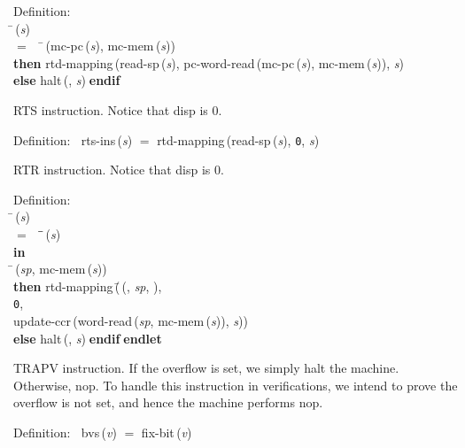 \begin{tabbing}{\sc Definition}: \\  
\=\,({\it{s\/}}) \\ 
$=$$\;\;\;\;$\=\,({\rm{mc-pc}}\,({\it{s\/}}), {\rm{mc-mem}}\,({\it{s\/}})) \\ 
{\bf then }{\rm{rtd-mapping}}\,({\rm{read-sp}}\,({\it{s\/}}), {\rm{pc-word-read}}\,({\rm{mc-pc}}\,({\it{s\/}}), {\rm{mc-mem}}\,({\it{s\/}})), {\it{s\/}}) \\ 
{\bf else }{\rm{halt}}\,({}, {\it{s\/}})$\;${\bf  endif}\-\-
\end{tabbing}

 RTS instruction.
 Notice that disp is 0.
\begin{tabbing}{\sc Definition}:$\;\;$
{\rm{rts-ins}}\,({\it{s\/}}) $=$ {\rm{rtd-mapping}}\,({\rm{read-sp}}\,({\it{s\/}}), {\tt{0}}, {\it{s\/}})
\end{tabbing}

 RTR instruction.
 Notice that disp is 0.
\begin{tabbing}{\sc Definition}: \\  
\=\,({\it{s\/}}) \\ 
$=$$\;\;\;\;$\=\=\,({\it{s\/}})\- \\ 
{\bf in} \\ 
\=\,({\it{sp\/}}, {\rm{mc-mem}}\,({\it{s\/}})) \\ 
{\bf then }{\rm{rtd-mapping}}\,(\=\,({}, {\it{sp\/}}, {}), \\ 
{\tt{0}}, \\ 
{\rm{update-ccr}}\,({\rm{word-read}}\,({\it{sp\/}}, {\rm{mc-mem}}\,({\it{s\/}})), {\it{s\/}}))\- \\ 
{\bf else }{\rm{halt}}\,({}, {\it{s\/}})$\;${\bf  endif}\-$\;${\bf  endlet}\-\-
\end{tabbing}

 TRAPV instruction.
 If the overflow is set, we simply halt the machine.  Otherwise, nop.
 To handle this instruction in verifications, we intend to prove the
 overflow is not set, and hence the machine performs nop.
\begin{tabbing}{\sc Definition}:$\;\;$
{\rm{bvs}}\,({\it{v\/}}) $=$ {\rm{fix-bit}}\,({\it{v\/}})
\end{tabbing}

